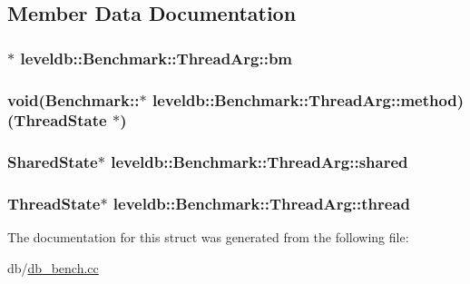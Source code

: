 \subsection{Member Data Documentation}
\hypertarget{structleveldb_1_1_benchmark_1_1_thread_arg_a12d3836200f9c5e6495b5adc3626fdfc}{
\subsubsection[{bm}]{$\ast$ leveldb\-::\-Benchmark\-::\-Thread\-Arg\-::bm}}\label{structleveldb_1_1_benchmark_1_1_thread_arg_a12d3836200f9c5e6495b5adc3626fdfc}
\hypertarget{structleveldb_1_1_benchmark_1_1_thread_arg_a16b81e6637e6fc22a4bafe8a76d6f39b}{
\subsubsection[{method}]{\setlength{\rightskip}{0pt plus 5cm}void(Benchmark\-::$\ast$ leveldb\-::\-Benchmark\-::\-Thread\-Arg\-::method)(Thread\-State $\ast$)}}\label{structleveldb_1_1_benchmark_1_1_thread_arg_a16b81e6637e6fc22a4bafe8a76d6f39b}
\hypertarget{structleveldb_1_1_benchmark_1_1_thread_arg_a655e31754ac547d299f1bccba169414a}{
\subsubsection[{shared}]{\setlength{\rightskip}{0pt plus 5cm}Shared\-State$\ast$ leveldb\-::\-Benchmark\-::\-Thread\-Arg\-::shared}}\label{structleveldb_1_1_benchmark_1_1_thread_arg_a655e31754ac547d299f1bccba169414a}
\hypertarget{structleveldb_1_1_benchmark_1_1_thread_arg_aad6ba56c77f3da2d369a032e211c92d8}{
\subsubsection[{thread}]{\setlength{\rightskip}{0pt plus 5cm}Thread\-State$\ast$ leveldb\-::\-Benchmark\-::\-Thread\-Arg\-::thread}}\label{structleveldb_1_1_benchmark_1_1_thread_arg_aad6ba56c77f3da2d369a032e211c92d8}


The documentation for this struct was generated from the following file\-:\begin{DoxyCompactItemize}
\item 
db/\hyperlink{db__bench_8cc}{db\-\_\-bench.\-cc}\end{DoxyCompactItemize}
